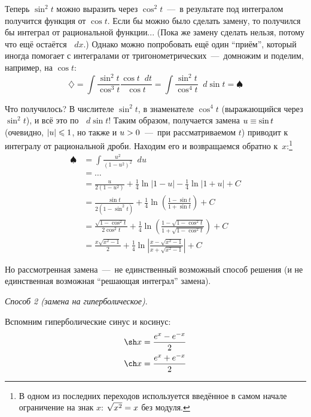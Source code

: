 \documentclass[a4paper,12pt]{article}
\newcommand{\diff}{\mathop{}\!d}
\begin{document}
\begin{example}
    Теперь $\sin^2 t$ можно выразить через $\cos^2 t$~---~в результате под интегралом получится функция от $\cos t$.
    Если бы можно было сделать замену, то получился бы интеграл от рациональной функции...
    (Пока же замену сделать нельзя, потому что ещё остаётся $\diff x$.)
    Однако можно попробовать ещё один ``приём'', который иногда помогает с интегралами от тригонометрических~---~домножим и поделим, например, на $\cos t$:
    \[
      \diamondsuit = \int \frac{\sin^2 t}{\cos^3 t} \frac{\cos t \diff t}{\cos t}
        = \int \frac{\sin^2 t}{\cos^4 t} \diff \sin t = \spadesuit
    \]

    Что получилось?
    В числителе $\sin^2 t$, в знаменателе $\cos^4 t$ (выражающийся через $\sin^2 t$), и всё это по $\diff \sin t$!
    Таким образом, получается замена $u \hm\equiv \sin t$ (очевидно, $|u| \hm\leq 1$, но также и $u \hm> 0$~---~при рассматриваемом $t$) приводит к интегралу от рациональной дроби.
    Находим его и возвращаемся обратно к~$x$:\footnote{
      В одном из последних переходов используется введённое в самом начале ограничение на знак $x$: $\sqrt{x^2} \hm= x$ без модуля.
    }
    \begin{equation*}
    \begin{split}
      \spadesuit &= \int \frac{u^2}{(1 - u^2)^2} \diff u\\
        &= \ldots\\
        &= \frac{u}{2(1 - u^2)} + \frac{1}{4} \ln\left|1 - u\right| - \frac{1}{4} \ln\left|1 + u\right| + C\\
        &=  \frac{\sin t}{2(1 - \sin^2 t)} + \frac{1}{4} \ln\left(\frac{1 - \sin t}{1 + \sin t}\right) + C\\
        &= \frac{\sqrt{1 - \cos^2 t}}{2 \cos^2 t} + \frac{1}{4} \ln\left(\frac{1 - \sqrt{1 - \cos^2 t}}{1 + \sqrt{1 - \cos^2 t}}\right) + C\\
        &= \frac{x \sqrt{x^2 - 1}}{2} + \frac{1}{4} \ln\left|\frac{x - \sqrt{x^2 - 1}}{x + \sqrt{x^2 - 1}}\right| + C
    \end{split}
    \end{equation*}

    Но рассмотренная замена~---~не единственный возможный способ решения (и не единственная возможная ``решающая интеграл'' замена).

    \medskip

    \noindent
    \emph{Способ 2 (замена на гиперболическое)}.

    Вспомним гиперболические синус и косинус:
    \begin{equation}\label{eq:sh-and-ch}
      \begin{aligned}
        &\sh x = \frac{e^x - e^{-x}}{2}\\
        &\ch x = \frac{e^x + e^{-x}}{2}
      \end{aligned}
    \end{equation}


\end{example}
\end{document}
